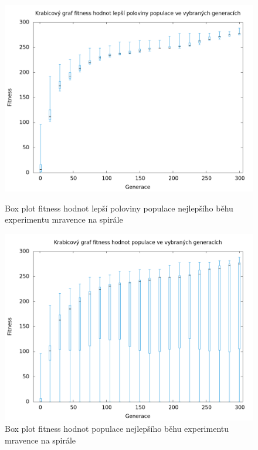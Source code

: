 \begin{figure}[h]
    \begin{minipage}[c]{0.48\linewidth}
        \includegraphics[width=\linewidth]{obrazky/bar_whisker_mravenec_spirala_top50.png}
        \caption{Box plot fitness hodnot lepší poloviny populace nejlepšího běhu experimentu mravence na spirále}
        \label{fig:bar_whisker_mravenec_spirala_top50}
    \end{minipage}
    \hfill
    \begin{minipage}[c]{0.48\linewidth}
        \includegraphics[width=\linewidth]{obrazky/bar_whisker_mravenec_spirala.png}
        \caption{Box plot fitness hodnot populace nejlepšího běhu experimentu mravence na spirále}
        \label{fig:bar_whisker_mravenec_spirala}
    \end{minipage}
\end{figure}

